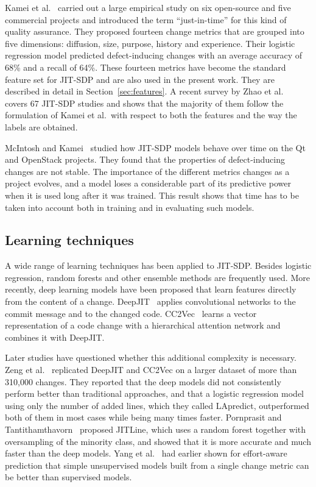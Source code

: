 \documentclass[12pt,a4paper,oneside]{report}
\begin{document}
Kamei et al.~\cite{kamei2013jit} carried out a large empirical study on six
open-source and five commercial projects and introduced the term
``just-in-time'' for this kind of quality assurance. They proposed fourteen
change metrics that are grouped into five dimensions: diffusion, size,
purpose, history and experience. Their logistic regression model predicted
defect-inducing changes with an average accuracy of 68\% and a recall of 64\%.
These fourteen metrics have become the standard feature set for JIT-SDP and
are also used in the present work. They are described in detail in
Section~\ref{sec:features}. A recent survey by Zhao et
al.~\cite{zhao2023survey} covers 67 JIT-SDP studies and shows that the
majority of them follow the formulation of Kamei et al.\ with respect to both
the features and the way the labels are obtained.

McIntosh and Kamei~\cite{mcintosh2018moving} studied how JIT-SDP models
behave over time on the Qt and OpenStack projects. They found that the
properties of defect-inducing changes are not stable. The importance of the
different metrics changes as a project evolves, and a model loses a
considerable part of its predictive power when it is used long after it was
trained. This result shows that time has to be taken into account both in
training and in evaluating such models.

\subsection{Learning techniques}

A wide range of learning techniques has been applied to JIT-SDP. Besides
logistic regression, random forests and other ensemble methods are frequently
used. More recently, deep learning models have been proposed that learn
features directly from the content of a change. DeepJIT~\cite{hoang2019deepjit}
applies convolutional networks to the commit message and to the changed code.
CC2Vec~\cite{hoang2020cc2vec} learns a vector representation of a code change
with a hierarchical attention network and combines it with DeepJIT.

Later studies have questioned whether this additional complexity is
necessary. Zeng et al.~\cite{zeng2021lapredict} replicated DeepJIT and CC2Vec
on a larger dataset of more than 310,000 changes. They reported that the deep
models did not consistently perform better than traditional approaches, and
that a logistic regression model using only the number of added lines, which
they called LApredict, outperformed both of them in most cases while being
many times faster. Pornprasit and
Tantithamthavorn~\cite{pornprasit2021jitline} proposed JITLine, which uses a
random forest together with oversampling of the minority class, and showed
that it is more accurate and much faster than the deep models. Yang et
al.~\cite{yang2016effort} had earlier shown for effort-aware prediction that
simple unsupervised models built from a single change metric can be better
than supervised models.
\end{document}
